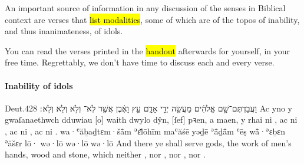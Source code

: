 \begin{paper}
	An important source of information in any discussion of the senses in Biblical context are verses that \hl{list modalities}, some of which are of the topos of inability, and thus inanimateness, of idols.

	You can read the verses printed in the \hl{handout} afterwards for yourself, in your free time. Regrettably, we don’t have time to discuss each and every verse.
\end{paper}



\paragraph{Inability of idols}

\begin{example}{Deut.}{4}{28}{}{}
	\quoling
	{וַעֲבַדְתֶּם־שָׁ֣ם אֱלֹהִ֔ים מַעֲשֵׂ֖ה יְדֵ֣י אָדָ֑ם עֵ֣ץ וָאֶ֔בֶן אֲשֶׁ֤ר לֹֽא־ וְלֹ֣א  וְלֹ֥א  וְלֹ֥א ׃}
	{Ac yno y gwaſanaethwch dduwiau [o] waith dwylo dŷn, [ſef] pꝛen, a maen, y rhai ni , ac ni , ac ni , ac ni .}
	{wa·ʿăḇaḏtɛm·šå̄m ʾɛ̆lōhīm maʿăśē yəḏē ʾå̄ḏå̄m ʿēṣ wå̄·ʾɛḇɛn ʾăšɛr lō· wə·lō  wə·lō  wə·lō }
	{And there ye shall serve gods, the work of men’s hands, wood and stone, which neither , nor , nor , nor .}
\end{example}

